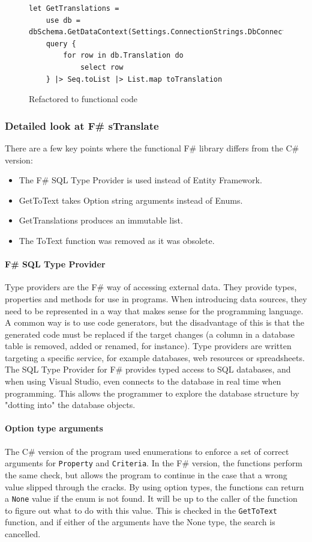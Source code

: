 \documentclass[12pt, a4paper]{article}
\newcommand{\code}[1]{{\small \texttt{#1}}}
\begin{document}
\begin{figure}[!h]
\begin{lstlisting}
let GetTranslations =
    use db = dbSchema.GetDataContext(Settings.ConnectionStrings.DbConnectionString)
    query {
        for row in db.Translation do 
            select row
    } |> Seq.toList |> List.map toTranslation 
\end{lstlisting}
\caption{Refactored to functional code}
\end{figure}

\newpage


\subsubsection{Detailed look at F\# sTranslate}
There are a few key points where the functional F\# library differs from the C\# version:
\begin{itemize}
	\item The F\# SQL Type Provider is used instead of Entity Framework.
	\item GetToText takes Option string arguments instead of Enums.
	\item GetTranslations produces an immutable list.
	\item The ToText function was removed as it was obsolete.
\end{itemize}

\paragraph{F\# SQL Type Provider} Type providers are the F\# way of accessing external data. They provide types, properties and methods for use in programs. When introducing data sources, they need to be represented in a way that makes sense for the programming language. A common way is to use code generators, but the disadvantage of this is that the generated code must be replaced if the target changes (a column in a database table is removed, added or renamed, for instance). Type providers are written targeting a specific service, for example databases, web resources or spreadsheets. The SQL Type Provider for F\# provides typed access to SQL databases, and when using Visual Studio, even connects to the database in real time when programming. This allows the programmer to explore the database structure by "dotting into" the database objects.

\paragraph{Option type arguments} The C\# version of the program used enumerations to enforce a set of correct arguments for \code{Property} and \code{Criteria}. In the F\# version, the functions perform the same check, but allows the program to continue in the case that a wrong value slipped through the cracks. By using option types, the functions can return a \code{None} value if the enum is not found. It will be up to the caller of the function to figure out what to do with this value. This is checked in the \code{GetToText} function, and if either of the arguments have the None type, the search is cancelled.
\end{document}
